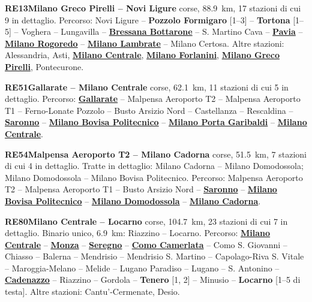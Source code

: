 \medskip\noindent\hypertarget{lin:RE13}{\textbf{RE13\enspace Milano Greco Pirelli -- Novi Ligure}} corse, \SI{88,9}{\km}, 17 stazioni di cui 9 in dettaglio. Percorso: Novi Ligure -- \hypertarget{sta:S04330}{\textbf{Pozzolo Formigaro}} [1--3] -- \hypertarget{sta:S01810}{\textbf{Tortona}} [1--5] -- Voghera -- Lungavilla -- \hyperlink{sta:S01805}{\textbf{Bressana Bottarone}} -- S. Martino Cava -- \hyperlink{sta:S01860}{\textbf{Pavia}} -- \hyperlink{sta:S01820}{\textbf{Milano Rogoredo}} -- \hyperlink{sta:S01701}{\textbf{Milano Lambrate}} -- Milano Certosa. Altre stazioni: Alessandria, Asti, \hyperlink{sta:S01700}{\textbf{Milano Centrale}}, \hyperlink{sta:S01492}{\textbf{Milano Forlanini}}, \hyperlink{sta:S01326}{\textbf{Milano Greco Pirelli}}, Pontecurone.

\medskip\noindent\hypertarget{lin:RE51}{\textbf{RE51\enspace Gallarate -- Milano Centrale}} corse, \SI{62,1}{\km}, 11 stazioni di cui 5 in dettaglio. Percorso: \hyperlink{sta:S01030}{\textbf{Gallarate}} -- Malpensa Aeroporto T2 -- Malpensa Aeroporto T1 -- Ferno-Lonate Pozzolo -- Busto Arsizio Nord -- Castellanza -- Rescaldina -- \hyperlink{sta:S01933}{\textbf{Saronno}} -- \hyperlink{sta:S01642}{\textbf{Milano Bovisa Politecnico}} -- \hyperlink{sta:S01645}{\textbf{Milano Porta Garibaldi}} -- \hyperlink{sta:S01700}{\textbf{Milano Centrale}}.

\medskip\noindent\hypertarget{lin:RE54}{\textbf{RE54\enspace Malpensa Aeroporto T2 -- Milano Cadorna}} corse, \SI{51,5}{\km}, 7 stazioni di cui 4 in dettaglio. Tratte in dettaglio: Milano Cadorna -- Milano Domodossola; Milano Domodossola -- Milano Bovisa Politecnico. Percorso: Malpensa Aeroporto T2 -- Malpensa Aeroporto T1 -- Busto Arsizio Nord -- \hyperlink{sta:S01933}{\textbf{Saronno}} -- \hyperlink{sta:S01642}{\textbf{Milano Bovisa Politecnico}} -- \hyperlink{sta:S01067}{\textbf{Milano Domodossola}} -- \hyperlink{sta:S01066}{\textbf{Milano Cadorna}}.

\medskip\noindent\hypertarget{lin:RE80}{\textbf{RE80\enspace Milano Centrale -- Locarno}} corse, \SI{104,7}{\km}, 23 stazioni di cui 7 in dettaglio. Binario unico, \SI{6,9}{\km}: Riazzino -- Locarno. Percorso: \hyperlink{sta:S01700}{\textbf{Milano Centrale}} -- \hyperlink{sta:S01322}{\textbf{Monza}} -- \hyperlink{sta:S01318}{\textbf{Seregno}} -- \hyperlink{sta:S09998}{\textbf{Como Camerlata}} -- Como S. Giovanni -- Chiasso -- Balerna -- Mendrisio -- Mendrisio S. Martino -- Capolago-Riva S. Vitale -- Maroggia-Melano -- Melide -- Lugano Paradiso -- Lugano -- S. Antonino -- \hyperlink{sta:S05404}{\textbf{Cadenazzo}} -- Riazzino -- Gordola -- \hypertarget{sta:S05401}{\textbf{Tenero}} [1, 2] -- Minusio -- \hypertarget{sta:S05400}{\textbf{Locarno}} [1--5 di testa]. Altre stazioni: Cantu'-Cermenate, Desio.
